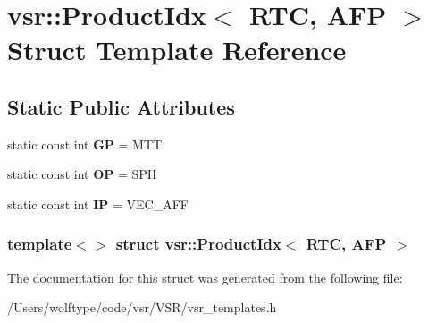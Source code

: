 \hypertarget{structvsr_1_1_product_idx_3_01_r_t_c_00_01_a_f_p_01_4}{\section{vsr\-:\-:Product\-Idx$<$ R\-T\-C, A\-F\-P $>$ Struct Template Reference}
\label{structvsr_1_1_product_idx_3_01_r_t_c_00_01_a_f_p_01_4}
}
\subsection*{Static Public Attributes}
\begin{DoxyCompactItemize}
\item 
\hypertarget{structvsr_1_1_product_idx_3_01_r_t_c_00_01_a_f_p_01_4_a80181bce9268f3cf79aa724acd906bcd}{static const int {\bfseries G\-P} = M\-T\-T}\label{structvsr_1_1_product_idx_3_01_r_t_c_00_01_a_f_p_01_4_a80181bce9268f3cf79aa724acd906bcd}

\item 
\hypertarget{structvsr_1_1_product_idx_3_01_r_t_c_00_01_a_f_p_01_4_ab0e3ee252589b03f5b9b55e2978a6ca3}{static const int {\bfseries O\-P} = S\-P\-H}\label{structvsr_1_1_product_idx_3_01_r_t_c_00_01_a_f_p_01_4_ab0e3ee252589b03f5b9b55e2978a6ca3}

\item 
\hypertarget{structvsr_1_1_product_idx_3_01_r_t_c_00_01_a_f_p_01_4_a8daa0f2a27855e26eb7b5375987775b8}{static const int {\bfseries I\-P} = V\-E\-C\-\_\-\-A\-F\-F}\label{structvsr_1_1_product_idx_3_01_r_t_c_00_01_a_f_p_01_4_a8daa0f2a27855e26eb7b5375987775b8}

\end{DoxyCompactItemize}
\subsubsection*{template$<$$>$ struct vsr\-::\-Product\-Idx$<$ R\-T\-C, A\-F\-P $>$}



The documentation for this struct was generated from the following file\-:\begin{DoxyCompactItemize}
\item 
/\-Users/wolftype/code/vsr/\-V\-S\-R/vsr\-\_\-templates.\-h\end{DoxyCompactItemize}
